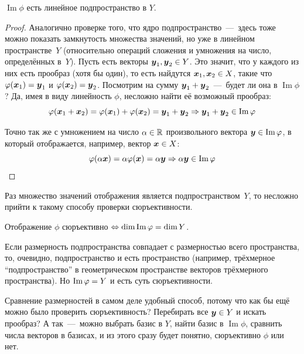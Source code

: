 \documentclass[a4paper,12pt]{article}
\DeclareMathOperator{\Imag}{Im}
\newcommand{\proofindent}{\hspace*{\fill}\par\vspace{0.5em}}
\begin{document}
  \begin{proposition}
    $\Imag \phi$ есть линейное подпространство в $Y$.
  \end{proposition}
  
  \begin{proof}
    Аналогично проверке того, что ядро подпространство~---~здесь тоже можно показать замкнутость множества значений, но уже в линейном пространстве~$Y$ (относительно операций сложения и умножения на число, определённых в~$Y$).
    Пусть есть векторы $\bds y_1, \bds y_2 \hm\in Y$.
    Это значит, что у каждого из них есть прообраз (хотя бы один), то есть найдутся $\bds x_1, \bds x_2 \hm\in X$, такие что $\phi(\bds x_1) \hm= \bds y_1$ и $\phi(\bds x_2) \hm= \bds y_2$.
    Посмотрим на сумму $\bds y_1 \hm+ \bds y_2$~---~будет ли она в $\Imag \phi$?
    Да, имея в виду линейность $\phi$, несложно найти её возможный прообраз:
    \[
      \phi(\bds x_1 + \bds x_2) = \phi(\bds x_1) + \phi(\bds x_2) = \bds y_1 + \bds y_2 \Rightarrow \bds y_1 + \bds y_2 \in \Imag \phi
    \]
    
    Точно так же с умножением на число $\alpha \hm\in \RR$ произвольного вектора $\bds y \hm\in \Imag \phi$, в который отображается, например, вектор $\bds x \hm\in X$:
    \[
      \phi(\alpha \bds x) = \alpha \phi(\bds x) = \alpha \bds y \Rightarrow \alpha \bds y \in \Imag \phi
    \]
  \end{proof}
  
  Раз множество значений отображения является подпространством~$Y$, то несложно прийти к такому способу проверки сюръективности.
  
  \begin{proposition}
    \proofindent
    Отображение $\phi$ сюръективно $\Leftrightarrow \dim\Imag\phi \hm= \dim Y$.
  \end{proposition}
  
  Если размерность подпространства совпадает с размерностью всего пространства, то, очевидно, подпространство и есть пространство (например, трёхмерное ``подпространство'' в геометрическом пространстве векторов трёхмерного пространства).
  Но $\Imag \phi \hm= Y$ и есть суть сюръективности.
  
  Сравнение размерностей в самом деле удобный способ, потому что как бы ещё можно было проверить сюръективность?
  Перебирать все $\boldsymbol y \in Y$ и искать прообраз?
  А так~---~можно выбрать базис в $Y$, найти базис в $\Imag \phi$, сравнить числа векторов в базисах, и из этого сразу будет понятно, сюръективно $\phi$ или нет.
  
\end{document}
